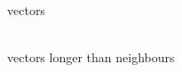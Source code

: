 \documentclass[12pt,a4paper,oneside,openright]{book}
\begin{document}
\begin{CJK}{UTF8}{}
\begin{figure}[htbp]
\begin{center}
\begin{minipage}[t]{.32\textwidth}
\begin{center}
        vectors
      \end{center}
    \end{minipage}
    \begin{minipage}[t]{.32\textwidth}
      \begin{center}
        \\
        vectors longer than neighbours
      \end{center}
    \end{minipage}\medskip\\
    \begin{minipage}[t]{.32\textwidth}
      \begin{center}
        \\

\end{center}
\end{minipage}
\end{center}
\end{figure}
\end{CJK}
\end{document}
